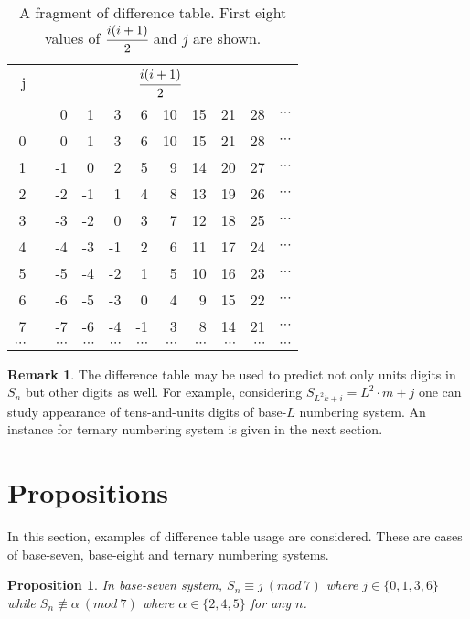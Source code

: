 \documentclass[12pt, twoside, leqno]{article}
\newtheorem{prop}[thm]{Proposition}
\theoremstyle{definition}
\newtheorem{rem}[thm]{Remark}
\numberwithin{equation}{section}
\begin{document}
\begin{table}[htb]
  \centering
  \caption{A fragment of difference table. First eight values of $\cfrac{i(i +1)}{2}$ and $j$ are shown.}
    \begin{tabular}{rrrrrrrrrrc}
    \hline
    j&&\multicolumn{8}{c}{$\cfrac{i(i +1)}{2}$}\\ \cline{3-11}
     &    & 0     & 1     & 3     & 6     & 10    & 15    & 21    & 28 &$\cdots$ \\
    \hline
    0 &   & 0     & 1     & 3     & 6     & 10    & 15    & 21    & 28 &$\cdots$ \\
    1 &   & -1    & 0     & 2     & 5     & 9     & 14    & 20    & 27 &$\cdots$ \\
    2 &   & -2    & -1    & 1     & 4     & 8     & 13    & 19    & 26 &$\cdots$ \\
    3 &   & -3    & -2    & 0     & 3     & 7     & 12    & 18    & 25 &$\cdots$ \\
    4 &   & -4    & -3    & -1    & 2     & 6     & 11    & 17    & 24 &$\cdots$ \\
    5 &   & -5    & -4    & -2    & 1     & 5     & 10    & 16    & 23 &$\cdots$ \\
    6 &   & -6    & -5    & -3    & 0     & 4     & 9     & 15    & 22 &$\cdots$ \\
    7 &   & -7    & -6    & -4    & -1    & 3     & 8     & 14    & 21 &$\cdots$ \\
$\cdots$& &$\cdots$ &$\cdots$ &$\cdots$ &$\cdots$ &$\cdots$ &$\cdots$ &$\cdots$ &$\cdots$ &$\cdots$ \\
    \hline
    \end{tabular}%
  \label{tab:1}%
\end{table}%

\begin{rem}
The difference table may be used to predict not only units digits in $S_n$ but other digits as well. For example, considering $S_{L^2k+i} = L^2\cdot m + j$ one can study appearance of tens-and-units digits of base-$L$ numbering system. An instance for ternary numbering system is given in the next section.
\end{rem}

\section{Propositions}
In this section, examples of difference table usage are considered. These are cases of base-seven, base-eight and ternary numbering systems.
\begin{prop}
In base-seven system, $S_n \equiv j \ (mod \ 7)$ where $j \in \{ 0, 1, 3, 6 \}$ while $S_n \not\equiv \alpha \ (mod \ 7)$ where $\alpha \in \{ 2, 4, 5\}$ for any $n$.
\end{prop}
\end{document}
